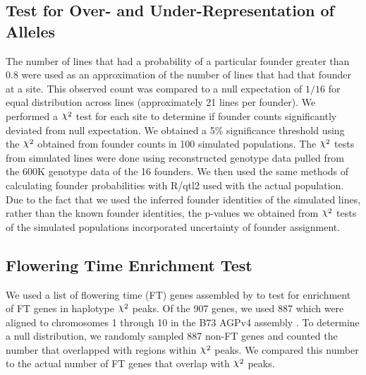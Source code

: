 \documentclass[article,9pt,twocolumn,twoside]{rilabRxiv}
\DeclareRobustCommand{\rchi}{{\mathpalette\irchi\relax}}
\newcommand{\irchi}[2]{\raisebox{\depth}{$#1\chi$}} %
\begin{document}
\subsection{Test for Over- and Under-Representation of Alleles}
The number of lines that had a probability of a particular founder greater than 0.8 were used as  an approximation of the number of lines that had that founder at a site.
This observed count was compared to a null expectation of $1/16$ for equal distribution across lines (approximately 21 lines per founder).
We performed a $\rchi^2$ test for each site to determine if founder counts significantly deviated from null expectation.
We obtained a 5\% significance threshold using the $\rchi^2$ obtained from founder counts in 100 simulated populations.
The $\rchi^2$ tests from simulated lines were done using reconstructed genotype data pulled from the 600K genotype data of the 16 founders.
We then used the same methods of calculating founder probabilities with R/qtl2 used with the actual population.
Due to the fact that we used the inferred founder identities of the simulated lines, rather than the known founder identities, the p-values we obtained from $\rchi^2$ tests of the simulated populations incorporated uncertainty of founder assignment.

\subsection{Flowering Time Enrichment Test}
We used a list of flowering time (FT) genes assembled by \citep{Li5} to test for enrichment of FT genes in haplotype $\rchi^2$ peaks.
Of the 907 genes, we used 887 which were aligned to chromosomes 1 through 10 in the B73 AGPv4 assembly \citep{Jiao}.
To determine a null distribution, we randomly sampled 887 non-FT genes and counted the number that overlapped with regions within $\rchi^2$ peaks.
We compared this number to the actual number of FT genes that overlap with $\rchi^2$ peaks.

\end{document}
